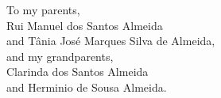 \begin{dedication}\label{dedication}
To my parents, \\
Rui Manuel dos Santos Almeida \\
and Tânia José Marques Silva de Almeida, \\[1em]
and my grandparents, \\
Clarinda dos Santos Almeida \\
and Herminio de Sousa Almeida.
\end{dedication}
